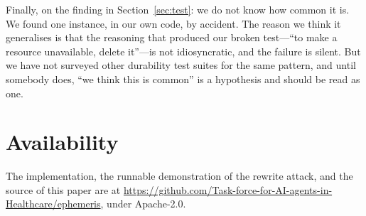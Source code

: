 \documentclass[11pt]{article}
\begin{document}
Finally, on the finding in Section~\ref{sec:test}: we do not know how common
it is. We found one instance, in our own code, by accident. The reason we
think it generalises is that the reasoning that produced our broken test---``to
make a resource unavailable, delete it''---is not idiosyncratic, and the
failure is silent. But we have not surveyed other durability test suites for
the same pattern, and until somebody does, ``we think this is common'' is a
hypothesis and should be read as one.

\section*{Availability}

The implementation, the runnable demonstration of the rewrite attack, and the
source of this paper are at
\url{https://github.com/Task-force-for-AI-agents-in-Healthcare/ephemeris},
under Apache-2.0.



\end{document}
